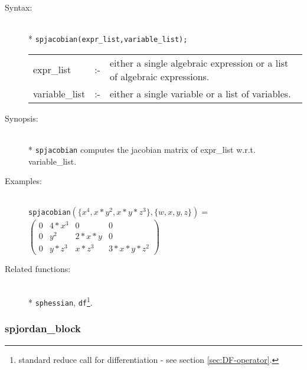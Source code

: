 \begin{description}
\item[Syntax:]\mbox{}\\*
\texttt{spjacobian(expr\_list,variable\_list);}\\[2mm]
\begin{tabular}{l l p{.72\linewidth}}
expr\_list    &:-& either a
single algebraic expression or a list of algebraic expressions.\\
variable\_list &:-& either a single variable or a list of variables.
\end{tabular}

\item[Synopsis:]\mbox{}\\*
\texttt{spjacobian} computes the jacobian matrix of expr\_list w.r.t.
variable\_list.

\item[Examples:]\mbox{}\\
\texttt{spjacobian}\((\{x^4,x*y^2,x*y*z^3\},\{w,x,y,z\}) =\) \\[2mm]
\(\begin{pmatrix} 0 & 4*x^3 & 0 & 0 \\ 0 & y^2 & 2*x*y & 0 \\
0 & y*z^3 & x*z^3 & 3*x*y*z^2
\end{pmatrix}\)

\item[Related functions:]\mbox{}\\*
\texttt{sphessian}, \texttt{df}\footnote{standard reduce call
for differentiation - see section \protect\ref{sec:DF-operator}.}.
\end{description}

\subsubsection{spjordan\_block}
\label{sparse:spjordan_block}
\hypertarget{operator:SPJORDAN_BLOCK}{}

